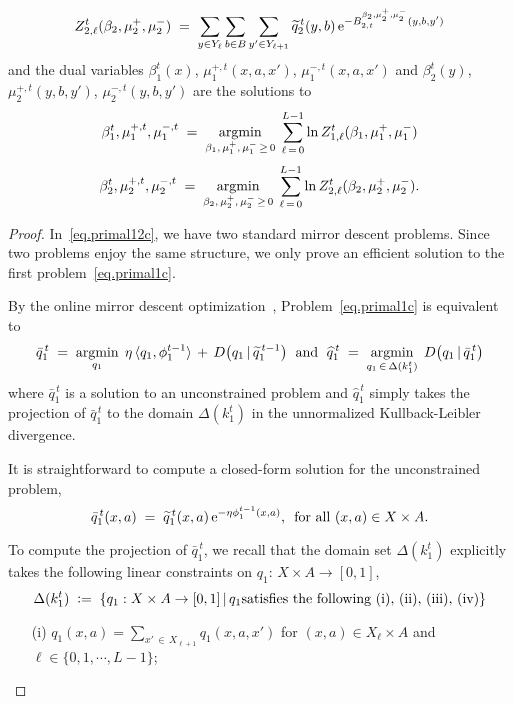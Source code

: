 \documentclass[12pt, final]{l4dc2023}
\begin{document}
\begin{lemma}
\[	\]
	\[
	Z_{2,\ell}^t (\beta_2,\mu_2^+,\mu_2^-)\;=\; \sum_{y\in Y_\ell}\sum_{b\in B} \sum_{y'\in Y_{\ell+1}}\tilde q_2^{\,t}(y,b)\,{\rm e}^{-B_{2,t}^{\beta_2,\mu_2^+,\mu_2^-}(y,b,y')}
	\]
	and the dual variables $\beta_1^t(x)$, $\mu_1^{+,t}(x,a,x')$, $\mu_1^{-,t}(x,a,x')$ and $\beta_2^t(y)$, $\mu_2^{+,t}(y,b,y')$, $\mu_2^{-,t}(y,b,y')$ are the solutions to
	\[
	\beta_1^t, \mu_1^{+,t}, \mu_1^{-,t}
	\;=\;
	\argmin_{\beta_1,\, \mu_1^+,\,\mu_1^-\,\geq \,0}\; \sum_{\ell\,=\,0}^{L-1} \ln Z_{1,\ell}^t (\beta_1,\mu_1^+,\mu_1^-)
	\]
	\[
	\beta_2^t, \mu_2^{+,t}, \mu_2^{-,t}
	\;=\;
	\argmin_{\beta_2,\, \mu_2^+,\,\mu_2^-\,\geq \,0}\; \sum_{\ell\,=\,0}^{L-1} \ln Z_{2,\ell}^t (\beta_2,\mu_2^+,\mu_2^-).
	\]
	
\end{lemma}
\begin{proof}
	In~\eqref{eq.primal12c}, we have two standard mirror descent problems. Since two problems enjoy the same structure, we only prove an efficient solution to the first problem~\eqref{eq.primal1c}.
	
	By the online mirror descent optimization~\citep{zimin2013online}, Problem~\eqref{eq.primal1c} is equivalent to
	\begin{equation}\label{eq.primal12steps1}
	\bar q_1^{\,t} 
	\;=\;
	\displaystyle \argmin_{q_1}  \;
	\eta \, \langle{q_1},{\phi_1^{t-1}}\rangle 
	\, +\, 
	\displaystyle D\big(q_1\,\vert\,  \tilde{q}_1^{\,t-1}\big)
	\;
	\text{ and }
	\;
	\hat q_1^{\,t}
	\;=\;
	\displaystyle \argmin_{q_1\,\in\,\Delta(k_1^t)}  \;
	\displaystyle D\big(q_1\,\vert\,  \bar{q}_1^{\,t}\big)
	\end{equation}
	where $\bar q_1^{\,t}$ is a solution to an unconstrained problem and $\hat q_1^{\,t}$ simply takes the projection of $\bar q_1^{\,t}$ to the domain $\Delta(k_1^t)$ in the unnormalized Kullback-Leibler divergence. 
	
	It is straightforward to compute a closed-form solution for the unconstrained problem,
	\begin{equation}\label{eq.unconstrained}
	\bar q_1^{\,t} (x,a) \;=\; \tilde q_1^{\,t} (x,a) \,{\rm e}^{- \eta\phi_1^{t-1}(x,a)},\,\text{ for all } (x,a)\in X\times A.
	\end{equation}
	
	To compute the projection of $\bar q_1^{\,t}$, we recall that the domain set $\Delta(k_1^t)$ explicitly takes the following linear constraints on $q_1$: $X\times A\to [0,1]$,
	\begin{equation}\label{eq.deltaset}
	\Delta(k_1^t) \;\DefinedAs\; \{ q_1: X\times A\to [0,1] \,\vert\, q_1 \text{satisfies the following (i), (ii), (iii), (iv)} \}
	\end{equation}
	\begin{itemize}
		\item [(i)] $q_1(x, a) = \sum_{x'\,\in\,X_{\ell+1}} q_1(x,a,x')$ for $(x,a)\in X_\ell\times A$ and $\ell \in\{0,1,\cdots,L-1\}$;
		

\end{itemize}
\end{proof}
\end{document}
